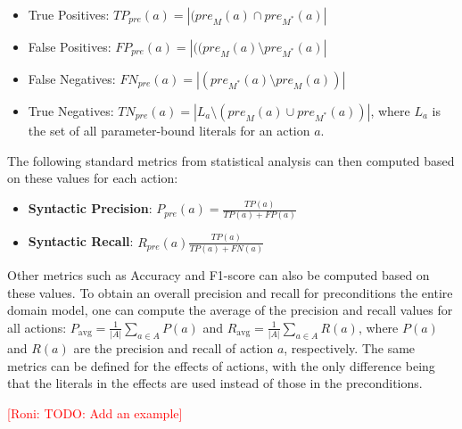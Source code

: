 \documentclass{article}
\theoremstyle{definition}
\theoremstyle{remark}
\newcommand{\realm}{\ensuremath{M^*}\xspace}
\newcommand{\pre}{\ensuremath{\textit{pre}}\xspace}
\newcommand{\eff}{\ensuremath{\textit{eff}}\xspace}
\newcommand{\roni}[1]{{\textcolor{red}{[Roni: #1]}}}
\begin{document}
 \begin{itemize}
    \item True Positives: $TP_\pre(a)=|(\pre_M(a)\cap \pre_\realm(a)|$
    \item False Positives: $FP_\pre(a)=|((\pre_M(a)\setminus \pre_\realm(a)|$
    \item False Negatives: $FN_\pre(a)=|(\pre_\realm(a)\setminus \pre_M(a))|$
    \item True Negatives: $TN_\pre(a)=|L_a \setminus(\pre_M(a)\cup \pre_\realm(a))|$, 
    where $L_a$ is the set of all parameter-bound literals for an action $a$. 
\end{itemize}
The following standard metrics from statistical analysis can then computed based on these values for each action:
\begin{itemize}
    \item \textbf{Syntactic Precision}: $P_\pre(a)=\frac{TP(a)}{TP(a)+FP(a)}$
    \item \textbf{Syntactic Recall}: $R_\pre(a)\frac{TP(a)}{TP(a)+FN(a)}$
\end{itemize}
Other metrics such as Accuracy and F1-score can also be computed based on these values. 
To obtain an overall precision and recall for preconditions the entire domain model, one can compute the average of the precision and recall values for all actions:
$P_\text{avg}=\frac{1}{|A|}\sum_{a\in A} P(a)$ and $R_\text{avg}=\frac{1}{|A|}\sum_{a\in A} R(a)$, where $P(a)$ and $R(a)$ are the precision and recall of action $a$, respectively. 
The same metrics can be defined for the effects of actions, with the only difference being that the literals in the effects are used instead of those in the preconditions. 

\roni{TODO: Add an example}

\end{document}

